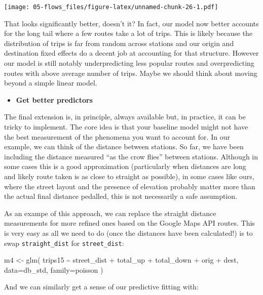 \documentclass[
]{book}
\newenvironment{Shaded}{\begin{snugshade}}{\end{snugshade}}
\newcommand{\AttributeTok}[1]{\textcolor[rgb]{0.77,0.63,0.00}{#1}}
\newcommand{\FunctionTok}[1]{\textcolor[rgb]{0.00,0.00,0.00}{#1}}
\newcommand{\NormalTok}[1]{#1}
\newcommand{\OtherTok}[1]{\textcolor[rgb]{0.56,0.35,0.01}{#1}}
\newcommand{\StringTok}[1]{\textcolor[rgb]{0.31,0.60,0.02}{#1}}
\providecommand{\tightlist}{%
  \setlength{\itemsep}{0pt}\setlength{\parskip}{0pt}}
\begin{document}
\texttt{[image: 05-flows\_files/figure-latex/unnamed-chunk-26-1.pdf]}

That looks significantly better, doesn't it? In fact, our model now better accounts for the long tail where a few routes take a lot of trips. This is likely because the distribution of trips is far from random across stations and our origin and destination fixed effects do a decent job at accounting for that structure. However our model is still notably underpredicting less popular routes and overpredicting routes with above average number of trips. Maybe we should think about moving beyond a simple linear model.

\begin{itemize}
\tightlist
\item
  \textbf{Get better predictors}
\end{itemize}

The final extension is, in principle, always available but, in practice, it can be tricky to implement. The core idea is that your baseline model might not have the best measurement of the phenomena you want to account for. In our example, we can think of the distance between stations. So far, we have been including the distance measured ``as the crow flies'' between stations. Although in some cases this is a good approximation (particularly when distances are long and likely route taken is as close to straight as possible), in some cases like ours, where the street layout and the presence of elevation probably matter more than the actual final distance pedalled, this is not necessarily a safe assumption.

As an exampe of this approach, we can replace the straight distance measurements for more refined ones based on the Google Maps API routes. This is very easy as all we need to do (once the distances have been calculated!) is to swap \texttt{straight\_dist} for \texttt{street\_dist}:

\begin{Shaded}
\begin{Highlighting}[]
\NormalTok{m4 }\OtherTok{\textless{}{-}} \FunctionTok{glm}\NormalTok{(}
  \StringTok{\textquotesingle{}trips15 \textasciitilde{} street\_dist + total\_up + total\_down + orig + dest\textquotesingle{}}\NormalTok{, }
  \AttributeTok{data=}\NormalTok{db\_std,}
  \AttributeTok{family=}\NormalTok{poisson}
\NormalTok{)}
\end{Highlighting}
\end{Shaded}

And we can similarly get a sense of our predictive fitting with:
\end{document}

